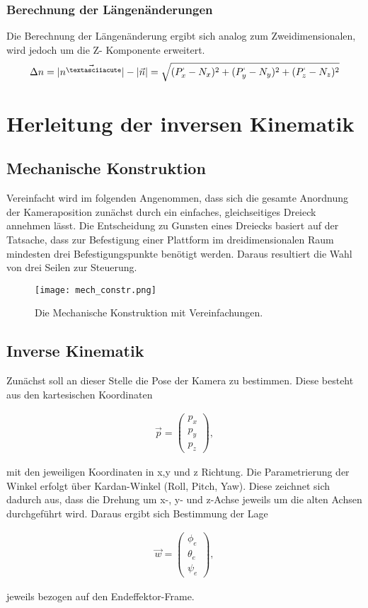 \documentclass[a4paper, 12pt]{article}
\begin{document}
			\subsubsection{Berechnung der Längenänderungen}
			Die Berechnung der Längenänderung ergibt sich analog zum Zweidimensionalen, wird jedoch um die Z- Komponente erweitert.
			\begin{align}
				\Delta n =
				|\vec{n^{´}}|-|\vec{n}|=
				\sqrt{
				(P^{`}_{x}-N_{x})^2+
				(P^{`}_{y}-N_{y})^2+
				(P^{`}_{z}-N_{z})^2
				}
			\end{align}
			\pagebreak	
	\section{Herleitung der inversen Kinematik }
		\subsection{Mechanische Konstruktion}
	Vereinfacht wird im folgenden Angenommen, dass sich die gesamte Anordnung der Kameraposition zunächst durch ein einfaches, gleichseitiges Dreieck annehmen lässt.
	Die Entscheidung zu Gunsten eines Dreiecks basiert auf der Tatsache, dass zur Befestigung einer Plattform im dreidimensionalen Raum mindesten drei Befestigungspunkte benötigt werden.
	Daraus resultiert die Wahl von drei Seilen zur Steuerung.
	
	\begin{figure}
		\centering
		\texttt{[image: mech\_constr.png]}
		\label{key}
		\caption{Die Mechanische Konstruktion mit Vereinfachungen.}
	\end{figure}

		\subsection{Inverse Kinematik}
		Zunächst soll an dieser Stelle die Pose der Kamera zu bestimmen. 
		Diese besteht aus den kartesischen Koordinaten
	
		\begin{align}
			\vec{p} = 
			\begin{pmatrix}
				p_x \\
				p_y \\
				p_z
			\end{pmatrix} , 
		\end{align}
	
		mit den jeweiligen Koordinaten in x,y und z Richtung.
		Die Parametrierung der Winkel erfolgt über Kardan-Winkel (Roll, Pitch, Yaw).
		Diese zeichnet sich dadurch aus, dass die Drehung um x-, y- und z-Achse jeweils um die alten Achsen durchgeführt wird.
		Daraus ergibt sich Bestimmung der Lage
	
		\begin{align}
			\vec{w}=
			\begin{pmatrix}
				\phi_e \\
				\theta_e \\
				\psi_e
			\end{pmatrix},
		\end{align}

		jeweils bezogen auf den Endeffektor-Frame.
	
		
\end{document}

